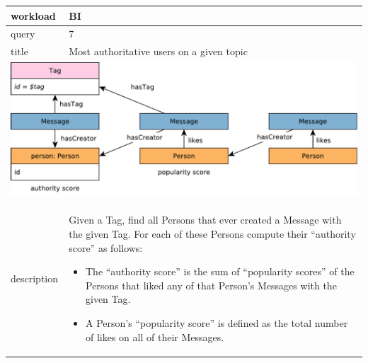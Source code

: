 \renewcommand*{\arraystretch}{1.1}

\noindent\begin{tabularx}{17cm}{|p{1.95cm}|X|}
	\hline
	workload    & BI \\ \hline
%
	query       & 7 \\ \hline
%
	title       & Most authoritative users on a given topic \\ \hline
	\multicolumn{2}{|c|}{ \includegraphics[scale=\patternscale,margin=0cm .2cm]{patterns/bi07}} \\ \hline
	description & Given a Tag, find all Persons that ever created a Message with the given
Tag. For each of these Persons compute their ``authority score'' as
follows:

\begin{itemize}
\tightlist
\item
  The ``authority score'' is the sum of ``popularity scores'' of the
  Persons that liked any of that Person's Messages with the given Tag.
\item
  A Person's ``popularity score'' is defined as the total number of
  likes on all of their Messages.
\end{itemize}
 \\ \hline
	

\end{tabularx}
